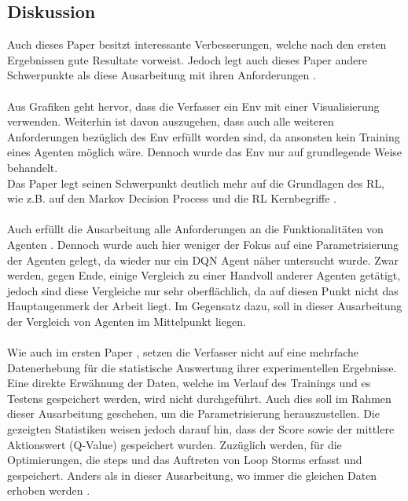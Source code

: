 \subsection{Diskussion}\label{subsec:Verwandte_Arbeiten_Paper_2_Diskussion}
Auch dieses Paper besitzt interessante Verbesserungen, welche nach den ersten Ergebnissen gute Resultate vorweist. Jedoch legt auch dieses Paper andere Schwerpunkte als diese Ausarbeitung mit ihren Anforderungen .\\
\\Aus Grafiken geht hervor, dass die Verfasser ein Env mit einer Visualisierung verwenden. Weiterhin ist davon auszugehen, dass auch alle weiteren Anforderungen bezüglich des Env  erfüllt worden sind, da ansonsten kein Training eines Agenten möglich wäre. Dennoch wurde das Env nur auf grundlegende Weise behandelt.\\
Das Paper legt seinen Schwerpunkt deutlich mehr auf die Grundlagen des RL, wie z.B. auf den Markov Decision Process und die RL Kernbegriffe .\\
\\Auch erfüllt die Ausarbeitung alle Anforderungen an die Funktionalitäten von Agenten . Dennoch wurde auch hier weniger der Fokus auf eine Parametrisierung der Agenten gelegt, da wieder nur ein DQN Agent näher untersucht wurde. Zwar werden, gegen Ende, einige Vergleich zu einer Handvoll anderer Agenten getätigt, jedoch sind diese Vergleiche nur sehr oberflächlich, da auf diesen Punkt nicht das Hauptaugenmerk der Arbeit liegt. 
Im Gegensatz dazu, soll in dieser Ausarbeitung der Vergleich von Agenten im Mittelpunkt liegen.\\
\\Wie auch im ersten Paper , setzen die Verfasser nicht auf eine mehrfache Datenerhebung für die statistische Auswertung ihrer experimentellen Ergebnisse.
Eine direkte Erwähnung der Daten, welche im Verlauf des Trainings und es Testens gespeichert werden, wird nicht durchgeführt. Auch dies soll im Rahmen dieser Ausarbeitung geschehen, um die Parametrisierung  herauszustellen.  
Die gezeigten Statistiken weisen jedoch darauf hin, dass der Score sowie der mittlere Aktionswert (Q-Value) gespeichert wurden. Zuzüglich werden, für die Optimierungen, die steps und das Auftreten von Loop Storms erfasst und gespeichert. Anders als in dieser Ausarbeitung, wo immer die gleichen Daten erhoben werden .\\
